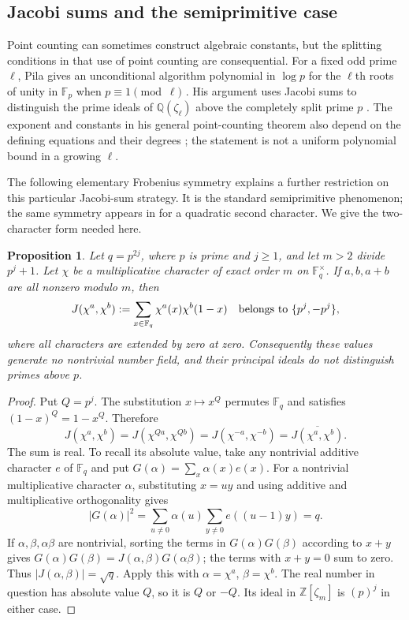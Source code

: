 \documentclass[11pt]{article}
\newtheorem{proposition}[theorem]{Proposition}
\theoremstyle{definition}
\theoremstyle{remark}
\begin{document}
\subsection{Jacobi sums and the semiprimitive case}
Point counting can sometimes construct algebraic constants, but the
splitting conditions in that use of point counting are consequential.
For a fixed odd prime $\ell$, Pila gives an unconditional algorithm
polynomial in $\log p$ for the $\ell$th roots of unity in
$\mathbb F_p$ when $p\equiv1\pmod\ell$
\citep[Theorem~D, author p.~2]{Pila1990}.
His argument uses Jacobi sums to distinguish the prime ideals of
$\mathbb Q(\zeta_\ell)$ above the completely split prime $p$
\citep[\S5, especially Propositions~5.1--5.3, author pp.~14--18]{Pila1990}.
The exponent and constants in his general point-counting theorem
also depend on the defining equations and their degrees
\citep[Theorem~A, author p.~1]{Pila1990}; the statement is not a
uniform polynomial bound in a growing $\ell$.

The following elementary Frobenius symmetry explains a further
restriction on this particular Jacobi-sum strategy.  It is the
standard semiprimitive phenomenon; the same symmetry appears in
\citet[Lemma~1, author p.~3]{Akiyama1996} for a quadratic second
character.  We give the two-character form needed here.

\begin{proposition}\label{prop:semiprimitive-jacobi}
Let $q=p^{2j}$, where $p$ is prime and $j\ge1$, and let
$m>2$ divide $p^j+1$.  Let $\chi$ be a multiplicative character
of exact order $m$ on $\mathbb F_q^\times$.
If $a,b,a+b$ are all nonzero modulo $m$, then
\[
 J(\chi^a,\chi^b)
 :=\sum_{x\in\mathbb F_q}\chi^a(x)\chi^b(1-x)
 \quad\hbox{belongs to }\{p^j,-p^j\},
\]
where all characters are extended by zero at zero.
Consequently these values generate no nontrivial number field,
and their principal ideals do not distinguish primes above $p$.
\end{proposition}

\begin{proof}
Put $Q=p^j$.  The substitution $x\mapsto x^Q$ permutes
$\mathbb F_q$ and satisfies $(1-x)^Q=1-x^Q$.  Therefore
\[
 J(\chi^a,\chi^b)=J(\chi^{Qa},\chi^{Qb})
   =J(\chi^{-a},\chi^{-b})
   =\overline{J(\chi^a,\chi^b)}.
\]
The sum is real.  To recall its absolute value, take any nontrivial
additive character $e$ of $\mathbb F_q$ and put
$G(\alpha)=\sum_x\alpha(x)e(x)$.
For a nontrivial multiplicative character $\alpha$, substituting
$x=uy$ and using additive and multiplicative orthogonality gives
\[
 |G(\alpha)|^2
 =\sum_{u\ne0}\alpha(u)\sum_{y\ne0}e((u-1)y)=q.
\]
If $\alpha,\beta,\alpha\beta$ are nontrivial, sorting the
terms in $G(\alpha)G(\beta)$ according to $x+y$ gives
$G(\alpha)G(\beta)=J(\alpha,\beta)G(\alpha\beta)$;
the terms with $x+y=0$ sum to zero.
Thus $|J(\alpha,\beta)|=\sqrt q$.
Apply this with $\alpha=\chi^a$, $\beta=\chi^b$.
The real number in question has absolute value $Q$, so it is
$Q$ or $-Q$.  Its ideal in $\mathbb Z[\zeta_m]$ is
$(p)^j$ in either case.
\end{proof}
\end{document}
